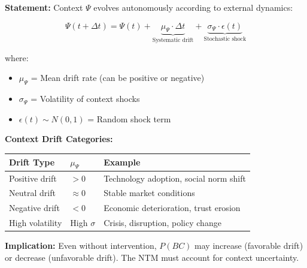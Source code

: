 \documentclass[11pt, a4paper]{article}
\begin{document}
\begin{tcolorbox}[colback=yellow!5!white, colframe=yellow!75!black,
    title=\textbf{Axiom NTM-A2: Context Drift Without Intervention}]

\textbf{Statement:} Context $\Psi$ evolves autonomously according to external dynamics:

\begin{equation}
\Psi(t + \Delta t) = \Psi(t) + \underbrace{\mu_{\Psi} \cdot \Delta t}_{\text{Systematic drift}} + \underbrace{\sigma_{\Psi} \cdot \epsilon(t)}_{\text{Stochastic shock}}
\end{equation}

where:
\begin{itemize}[nosep]
\item $\mu_{\Psi}$ = Mean drift rate (can be positive or negative)
\item $\sigma_{\Psi}$ = Volatility of context shocks
\item $\epsilon(t) \sim N(0,1)$ = Random shock term
\end{itemize}

\textbf{Context Drift Categories:}
\begin{center}
\renewcommand{\arraystretch}{1.2}
\begin{tabular}{@{}lll@{}}
\toprule
\textbf{Drift Type} & \textbf{$\mu_{\Psi}$} & \textbf{Example} \\
\midrule
Positive drift & $> 0$ & Technology adoption, social norm shift \\
Neutral drift & $\approx 0$ & Stable market conditions \\
Negative drift & $< 0$ & Economic deterioration, trust erosion \\
High volatility & High $\sigma$ & Crisis, disruption, policy change \\
\bottomrule
\end{tabular}
\end{center}

\textbf{Implication:} Even without intervention, $P(BC)$ may increase (favorable drift) or decrease (unfavorable drift). The NTM must account for context uncertainty.

\end{tcolorbox}
\end{document}
